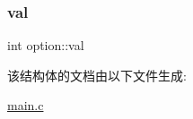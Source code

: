 \mbox{\label{structoption_a13bd155ec3b405d29c41ab8d0793be11}} 
\subsubsection{\texorpdfstring{val}{val}}
{\footnotesize\ttfamily int option\+::val}



该结构体的文档由以下文件生成\+:\begin{DoxyCompactItemize}
\item 
\hyperlink{main_8c}{main.\+c}\end{DoxyCompactItemize}
